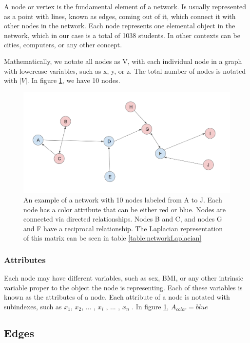 A node or vertex is the fundamental element of a network. Is usually represented as a point with lines, known as edges, coming out of it, which connect it with other nodes in the network. Each node represents one elemental object in the network, which in our case is a total of 1038 students. In other contexts can be cities, computers, or any other concept.

Mathematically, we notate all nodes as V, with each individual node in a graph with lowercase variables, such as x, y, or z. The total number of nodes is notated with $|V|$. In figure \ref{figure:networkExampleBasic}, we have 10 nodes.

    \begin{figure}[ht]
        \centering
            \includegraphics[width=0.7\linewidth]{figures/Networks/Concepts/directed.png} 
        \caption{An example of a network with 10 nodes labeled from A to J. Each node has a color attribute that can be either red or blue. Nodes are connected via directed relationships. Nodes B and C, and nodes G and F have a reciprocal relationship. The Laplacian representation of this matrix can be seen in table \ref{table:networkLaplacian}}
        \label{figure:networkExampleBasic}
    \end{figure}



\clearpage

\subsubsection{Attributes}

Each node may have different variables, such as sex, BMI, or any other intrinsic variable proper to the object the node is representing. Each of these variables is known as the attributes of a node. Each attribute of a node is notated with subindexes, such as $x_1$, $x_2$, ... , $x_i$ , ... , $x_n$ . In figure \ref{figure:networkExampleBasic}, $A_{color} = blue$

\subsection{Edges}

